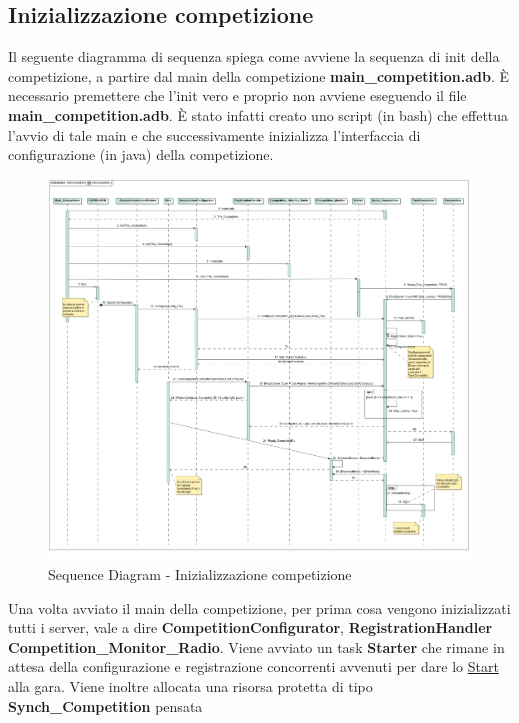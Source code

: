 \subsection{Inizializzazione competizione}
Il seguente diagramma di sequenza spiega come avviene la sequenza di init della competizione, a partire dal main della competizione \textbf{main\_competition.adb}.
\`{E} necessario premettere che l'init vero e proprio non avviene eseguendo il file \textbf{main\_competition.adb}. 
\`{E} stato infatti creato uno script (in bash) che effettua l'avvio di tale main e che successivamente inizializza 
l'interfaccia di configurazione (in java) della competizione.
\begin{center}
\begin{figure}[h!]
\advance\leftskip-3.2cm
	\includegraphics[angle=90,scale=0.35]{img/SequenceDiagrams/InitCompetition.jpg}
\caption{Sequence Diagram - Inizializzazione competizione}
\end{figure}
\end{center}
\clearpage
Una volta avviato il main della competizione, per prima cosa vengono inizializzati tutti i server, vale a dire \textbf{CompetitionConfigurator},
\textbf{RegistrationHandler} \textbf{Competition\_Monitor\_Radio}. Viene avviato un task \textbf{Starter} che rimane in attesa
della configurazione e registrazione concorrenti avvenuti per dare lo \underline{Start} alla gara. Viene inoltre allocata una risorsa protetta di tipo \textbf{Synch\_Competition} pensata

